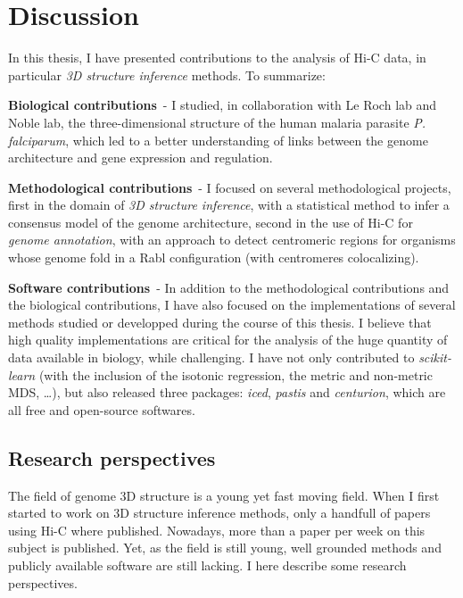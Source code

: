 
\chapter{Discussion} %

In this thesis, I have presented contributions to the analysis of Hi-C data,
in particular \textit{3D structure inference} methods. To summarize:

\textbf{Biological contributions}\ - I studied, in collaboration with Le Roch
lab and Noble lab, the three-dimensional structure of the human malaria
parasite \textit{P. falciparum}, which led to a better understanding of links
between the genome architecture and gene expression and regulation.

\textbf{Methodological contributions}\ - I focused on several methodological
projects,
first in the domain of \textit{3D structure inference}, with a statistical
method to infer a consensus model of the genome architecture, second in the
use of Hi-C for \textit{genome annotation}, with an approach to detect
centromeric regions for organisms whose genome fold in a Rabl configuration
(with centromeres colocalizing).

\textbf{Software contributions}\ - In addition to the methodological
contributions and the biological contributions, I have also focused on the
implementations of several methods studied or developped during the course of
this thesis. I believe that high quality implementations are critical for the
analysis of the huge quantity of data available in biology, while challenging.
I have not only contributed to \textit{scikit-learn} (with the inclusion of
the isotonic regression, the metric and non-metric MDS, \dots), but also
released three packages: \textit{iced}, \textit{pastis} and
\textit{centurion}, which are all free and open-source softwares.

\section*{Research perspectives}

The field of genome 3D structure is a young yet fast moving field. When I
first started to work on 3D structure inference methods, only a handfull of
papers using Hi-C where published. Nowadays, more than a paper per week on
this subject is published. Yet, as the field is still young, well grounded
methods and publicly available software are still lacking. I here describe
some research perspectives.


